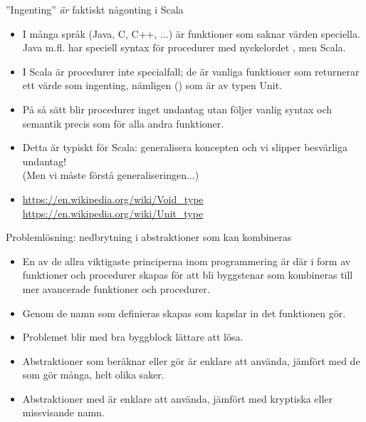 \begin{Slide}{''Ingenting'' \emph{är} faktiskt någonting i Scala}
\begin{itemize}
\item I många språk (Java, C, C++, ...) är funktioner som saknar värden speciella.
 Java m.fl. har speciell syntax för procedurer med nyckelordet , men  Scala.

\item I Scala är procedurer inte specialfall; de är vanliga funktioner som returnerar ett värde som  ingenting, nämligen () som är av typen Unit.

\item På så sätt blir procedurer inget undantag utan följer vanlig syntax och semantik precis som för alla andra funktioner.

\item Detta är typiskt för Scala: generalisera koncepten och vi slipper besvärliga undantag! \\(Men vi måste förstå generaliseringen...)


\item [] {\SlideFontSmall
\url{https://en.wikipedia.org/wiki/Void_type}
\url{https://en.wikipedia.org/wiki/Unit_type}
}

\end{itemize}

\end{Slide}

\begin{Slide}{Problemlösning: nedbrytning i abstraktioner som kan kombineras}\SlideFontSmall
\begin{itemize}
\item En av de allra viktigaste principerna inom programmering är  där   i form av funktioner och procedurer skapas för att bli byggstenar som kombineras till mer avancerade funktioner och procedurer.

\item Genom de namn som definieras skapas  som kapslar in det funktionen gör.

\item Problemet blir med bra byggblock lättare att lösa.

\item Abstraktioner som beräknar eller gör  är enklare att använda, jämfört med de som gör många, helt olika saker.

\item Abstraktioner med  är enklare att använda, jämfört med kryptiska eller missvisande namn.
\end{itemize}

\end{Slide}



